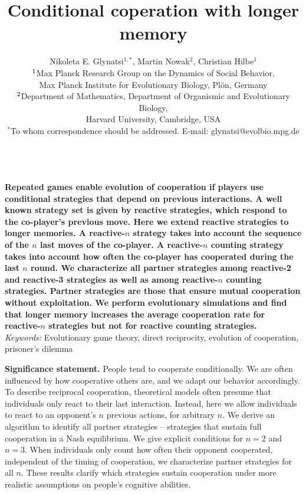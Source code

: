 \documentclass[11pt]{article}
\title{\bfseries \sffamily \Large Conditional coperation with longer memory}
\author{Nikoleta E. Glynatsi$^{1,*}$, Martin Nowak$^2$, Christian Hilbe$^1$\\[0.3cm]
$^{\rm 1}$Max Planck Research Group on the Dynamics of Social Behavior,\\ Max Planck Institute for Evolutionary Biology, Pl\"{o}n, Germany \\
$^{\rm 2}$Department of Mathematics,
Department of Organismic and Evolutionary Biology,\\ Harvard University, Cambridge, USA\\
$^*$To whom correspondence should be addressed. E-mail: glynatsi@evolbio.mpg.de
}
\date{}
\begin{document}
\maketitle

~\\[0.5cm]
\noindent
{\bf 
Repeated games enable evolution of cooperation if players use conditional
strategies that depend on previous interactions. A well known strategy set is
given by reactive strategies, which respond to the co-player's previous move.
Here we extend reactive strategies to longer memories. A reactive-$n$ strategy
takes into account the sequence of the $n$ last moves of the co-player. A
reactive-$n$ counting strategy takes into account how often the co-player has
cooperated during the last $n$ round. We characterize all partner strategies among
reactive-2 and reactive-3 strategies as well as among reactive-$n$ counting
strategies. Partner strategies are those that ensure mutual cooperation without
exploitation. We perform evolutionary simulations and find that longer memory
increases the average cooperation rate for reactive-$n$ strategies but not for
reactive counting strategies.
}\\[1cm]


\noindent
{\it Keywords:} Evolutionary game theory, direct reciprocity, evolution of cooperation, prisoner's dilemma



\clearpage
\newpage



\noindent
{\bf Significance statement.} People tend to cooperate conditionally. 
We are often influenced by how cooperative others are, and we adapt our behavior accordingly. 
To describe reciprocal cooperation, theoretical models often presume that individuals only react to their last interaction. 
Instead, here we allow individuals to react to an opponent's $n$ previous actions, for arbitrary $n$.
We derive an algorithm to identify all partner strategies -- strategies that sustain full cooperation in a Nash equilibrium.
We give explicit conditions for $n\!=\!2$ and $n\!=\!3$. 
When individuals only count how often their opponent cooperated, independent of the timing of cooperation, we characterize partner strategies for all $n$.
These results clarify which strategies sustain cooperation under more realistic assumptions on people's cognitive abilities. 
\end{document}
